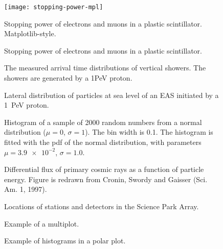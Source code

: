 \documentclass[a4paper,11pt]{article}
\begin{document}
\begin{figure}
\centering
\texttt{[image: stopping-power-mpl]}
\caption{Stopping power of electrons and muons in a plastic scintillator.
Matplotlib-style.}
\end{figure}

\begin{figure}
\centering

\caption{Stopping power of electrons and muons in a plastic scintillator.}
\end{figure}

\begin{figure}
\centering
{
}
\caption{The measured arrival time distributions of vertical showers. The
showers are generated by a 1PeV proton.}
\end{figure}

\begin{figure}
\centering

\caption{Lateral distribution of particles at sea level of an EAS
initiated by a \SI{1}{\peta\electronvolt} proton.}
\end{figure}

\begin{figure}
\centering

\caption{Histogram of a sample of \num{2000} random numbers from a normal
distribution ($\mu = 0$, $\sigma = 1$).  The bin width is \num{.1}.  The
histogram is fitted with the pdf of the normal distribution, with
parameters $\mu = \num{3.9e-2}$, $\sigma=\num{1.0}$.}
\end{figure}

\begin{figure}
\centering

\caption{Differential flux of primary cosmic rays as a function of
particle energy.  Figure is redrawn from Cronin, Swordy and Gaisser (Sci.
Am. 1, 1997).}
\end{figure}

\begin{figure}
\centering
{
}
\caption{Locations of stations and detectors in the Science Park Array.}
\end{figure}

\begin{figure}
\centering

\caption{Example of a multiplot.}
\end{figure}

\begin{figure}
\centering

\caption{Example of histograms in a polar plot.}
\end{figure}
\end{document}
